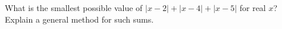 What is the smallest possible value of $|x-2|+|x-4|+|x-5|$ for real $x$? Explain a general method for such sums.
